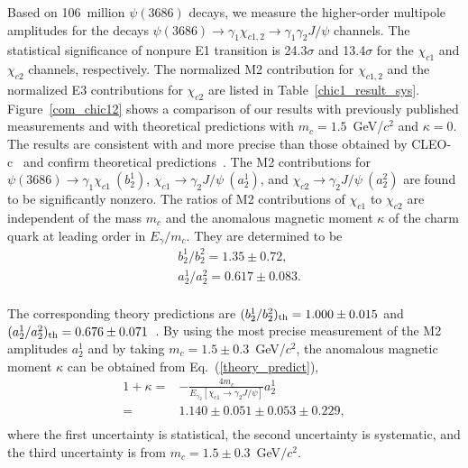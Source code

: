 \documentclass[prd,twocolumn,showpacs,amsmath,amssymb]{revtex4-1}
\begin{document}
Based on 106~million $\psi(3686)$ decays, we measure the higher-order multipole amplitudes for the decays
$\psi(3686)\rightarrow\gamma_{1}\chi_{c1,2}\rightarrow\gamma_1\gamma_{2}J/\psi$ channels. The statistical significance of
nonpure E1 transition is 24.3$\sigma$ and 13.4$\sigma$ for the $\chi_{c1}$ and $\chi_{c2}$ channels, respectively. The normalized M2 contribution for
$\chi_{c1,2}$ and the normalized E3 contributions for $\chi_{c2}$ are listed in Table~\ref{chic1_result_sys}.
Figure~\ref{com_chic12} shows a comparison of our results with previously published measurements and with theoretical predictions with $m_{c} = 1.5$~GeV/$c^2$ and $\kappa = 0$.
The results are consistent with and more precise than
those obtained by CLEO-c~\cite{CLEO-c} and confirm theoretical predictions~\cite{M2_theory1,M2_theory2}. The M2 contributions for
$\psi(3686)\rightarrow\gamma_{1}\chi_{c1}~(b_{2}^{1})$, $\chi_{c1}\rightarrow\gamma_{2}J/\psi~(a_{2}^{1})$, and
$\chi_{c2}\rightarrow\gamma_{2}J/\psi~(a_{2}^{2})$ are found to be significantly nonzero.
The ratios of M2 contributions of $\chi_{c1}$ to $\chi_{c2}$ are
independent of the mass $m_{c}$ and the anomalous magnetic moment
$\kappa$ of the charm quark at leading order in $E_{\gamma}/m_{c}$.  They are determined to be
\begin{equation}\label{ratio_M2}
\begin{split}
&b_{2}^{1}/b_{2}^{2} = 1.35\pm0.72,\\
&a_{2}^{1}/a_{2}^{2} = 0.617\pm0.083.\\
\end{split}
\end{equation}

\noindent The corresponding theory predictions are $(b_{2}^{1}/b_{2}^{2})_{\rm th} = 1.000\pm0.015$ and
$(a_{2}^{1}/a_{2}^{2})_{\rm th} = 0.676\pm0.071$~\cite{CLEO-c}.
By using the most precise measurement of the M2 amplitudes $a_{2}^{1}$ and by taking $m_{c}=1.5\pm0.3$~GeV/$c^2$, the anomalous magnetic moment
$\kappa$ can be obtained
from Eq.~(\ref{theory_predict}),
%
\begin{equation}\label{kappa}
\begin{split}
1+\kappa = &-\frac{4m_{c}}{E_{\gamma_{2}}[\chi_{c1}\rightarrow\gamma_{2}J/\psi]}a_{2}^{1}\\
 =& 1.140\pm0.051\pm0.053\pm0.229,\\
\end{split}
\end{equation}
\noindent where the first uncertainty is statistical, the second uncertainty is systematic, and the third uncertainty is from $m_{c}=1.5\pm0.3$~GeV$/c^2$.
\end{document}
